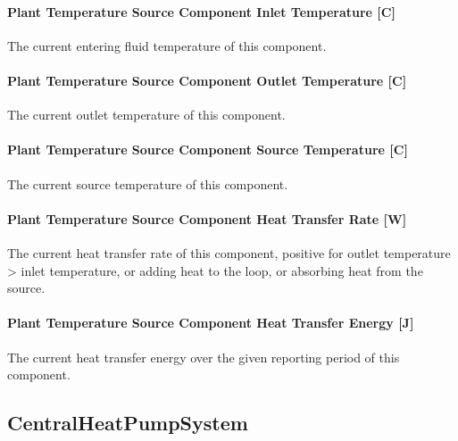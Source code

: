 \paragraph{Plant Temperature Source Component Inlet Temperature {[}C{]}}\label{plant-temperature-source-component-inlet-temperature-c}

The current entering fluid temperature of this component.

\paragraph{Plant Temperature Source Component Outlet Temperature {[}C{]}}\label{plant-temperature-source-component-outlet-temperature-c}

The current outlet temperature of this component.

\paragraph{Plant Temperature Source Component Source Temperature {[}C{]}}\label{plant-temperature-source-component-source-temperature-c}

The current source temperature of this component.

\paragraph{Plant Temperature Source Component Heat Transfer Rate {[}W{]}}\label{plant-temperature-source-component-heat-transfer-rate-w}

The current heat transfer rate of this component, positive for outlet temperature \textgreater{} inlet temperature, or adding heat to the loop, or absorbing heat from the source.

\paragraph{Plant Temperature Source Component Heat Transfer Energy {[}J{]}}\label{plant-temperature-source-component-heat-transfer-energy-j}

The current heat transfer energy over the given reporting period of this component.

\subsection{CentralHeatPumpSystem}\label{centralheatpumpsystem}

